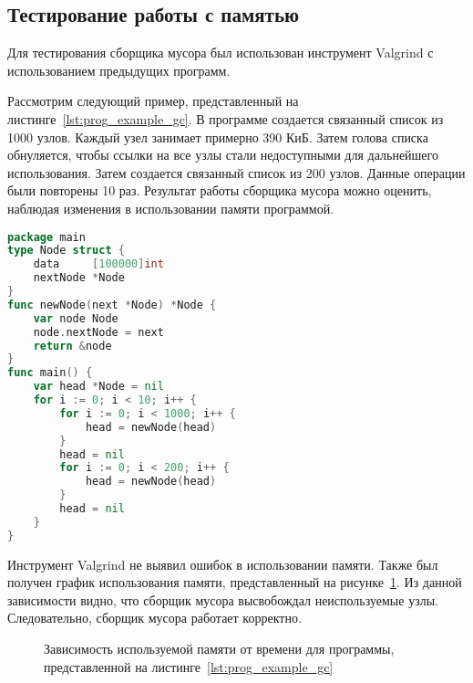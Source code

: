 \subsection*{Тестирование работы с памятью}

Для тестирования сборщика мусора был использован инструмент Valgrind с использованием предыдущих программ.

Рассмотрим следующий пример, представленный на листинге~\ref{lst:prog_example_gc}.
В программе создается связанный список из 1000 узлов.
Каждый узел занимает примерно 390 КиБ.
Затем голова списка обнуляется, чтобы ссылки на все узлы стали недоступными для дальнейшего использования.
Затем создается связанный список из 200 узлов.
Данные операции были повторены 10 раз.
Результат работы сборщика мусора можно оценить, наблюдая изменения в использовании памяти программой.

\begin{lstlisting}[label=lst:prog_example_gc,language=go,basicstyle=\scriptsize,numberstyle=\tiny,caption={Программа для тестирования сборщика мусора}]
package main
type Node struct {
	data     [100000]int
	nextNode *Node
}
func newNode(next *Node) *Node {
	var node Node
	node.nextNode = next
	return &node
}
func main() {
	var head *Node = nil
	for i := 0; i < 10; i++ {
		for i := 0; i < 1000; i++ {
			head = newNode(head)
		}
		head = nil
		for i := 0; i < 200; i++ {
			head = newNode(head)
		}
		head = nil
	}
}
\end{lstlisting}

Инструмент Valgrind не выявил ошибок в использовании памяти.
Также был получен график использования памяти, представленный на рисунке~\ref{fig:valgrind-massif}.
Из данной зависимости видно, что сборщик мусора высвобождал неиспользуемые узлы.
Следовательно, сборщик мусора работает корректно.

\begin{figure}[h]
	\centering

	

	\caption{Зависимость используемой памяти от времени для программы, представленной на листинге~\ref{lst:prog_example_gc}}
	\label{fig:valgrind-massif}
\end{figure}


